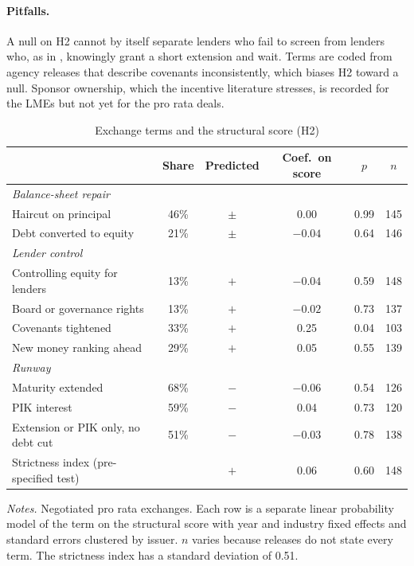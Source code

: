 \documentclass[12pt]{article}
\begin{document}
\paragraph{Pitfalls.} A null on H2 cannot by itself separate lenders who fail to screen from lenders who, as in \citet{kahl2002}, knowingly grant a short extension and wait. Terms are coded from agency releases that describe covenants inconsistently, which biases H2 toward a null. Sponsor ownership, which the incentive literature stresses, is recorded for the LMEs but not yet for the pro rata deals.

\begin{table}[H]
\centering
\caption{Exchange terms and the structural score (H2)}
\label{tab:h2}
\small
\begin{tabular}{l c c c c c}
\toprule
 & Share & Predicted & Coef.\ on score & $p$ & $n$ \\
\midrule
\textit{Balance-sheet repair} & & & & & \\
\quad Haircut on principal & 46\% & $\pm$ & 0.00 & 0.99 & 145 \\
\quad Debt converted to equity & 21\% & $\pm$ & $-0.04$ & 0.64 & 146 \\
\textit{Lender control} & & & & & \\
\quad Controlling equity for lenders & 13\% & $+$ & $-0.04$ & 0.59 & 148 \\
\quad Board or governance rights & 13\% & $+$ & $-0.02$ & 0.73 & 137 \\
\quad Covenants tightened & 33\% & $+$ & 0.25 & 0.04 & 103 \\
\quad New money ranking ahead & 29\% & $+$ & 0.05 & 0.55 & 139 \\
\textit{Runway} & & & & & \\
\quad Maturity extended & 68\% & $-$ & $-0.06$ & 0.54 & 126 \\
\quad PIK interest & 59\% & $-$ & 0.04 & 0.73 & 120 \\
\quad Extension or PIK only, no debt cut & 51\% & $-$ & $-0.03$ & 0.78 & 138 \\
\addlinespace
Strictness index (pre-specified test) & & $+$ & 0.06 & 0.60 & 148 \\
\bottomrule
\end{tabular}
\begin{minipage}{0.92\textwidth}\vspace{4pt}\footnotesize
\textit{Notes.} Negotiated pro rata exchanges. Each row is a separate linear probability model of the term on the structural score with year and industry fixed effects and standard errors clustered by issuer. $n$ varies because releases do not state every term. The strictness index has a standard deviation of 0.51.
\end{minipage}
\end{table}
\end{document}
